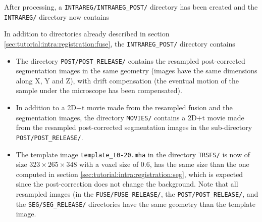 After processing, a \texttt{INTRAREG/INTRAREG\_POST/} directory has
been created and the \texttt{INTRAREG/} directory now contains

\mbox{}
\mbox{}

In addition to directories already described in section
\ref{sec:tutorial:intra:registration:fuse}, the \texttt{INTRAREG\_POST/} directory contains
\begin{itemize}
\itemsep -0.5ex
\item The directory \texttt{POST/POST\_RELEASE/} contains the resampled
  post-corrected segmentation images
  in the same geometry (images have the same dimensions along X, Y and
  Z), with drift compensation (the eventual motion of the sample under the
  microscope has been compensated). 
\item In addition to a 2D+t movie made from the resampled fusion
  and the segmentation images, the directory \texttt{MOVIES/} contains
  a 2D+t movie made from the resampled post-corrected segmentation
  images in the sub-directory \texttt{POST/POST\_RELEASE/}.
\item The template image \texttt{template\_t0-20.mha} in the directory
  \texttt{TRSFS/} 
  is now of size $323 \times 265 \times 348$ with a voxel size of 0.6,
  has the same size than the one computed in section
  \ref{sec:tutorial:intra:registration:seg},  which is expected since
  the post-correction does not change the background.
  Note that all resampled images (in the \texttt{FUSE/FUSE\_RELEASE/}, the
  \texttt{POST/POST\_RELEASE/}, and the
  \texttt{SEG/SEG\_RELEASE/} directories have the same geometry than the template
  image. 
\end{itemize}



